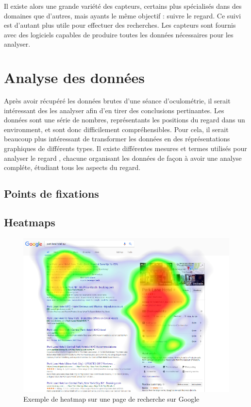 \documentclass[12pt]{article}
\begin{document}
\bigskip
Il existe alors une grande variété des capteurs, certains plus spécialisés dans
des domaines que d'autres, mais ayants le même objectif : suivre le regard. Ce
suivi est d'autant plus utile pour effectuer des recherches. Les capteurs sont
fournis avec des logiciels capables de produire toutes les données nécessaires
pour les analyser.


\section{Analyse des données}

Après avoir récupéré les données brutes d'une séance d'oculométrie, il serait
intéressant des les analyser afin d'en tirer des conclusions pertinantes. Les
données sont une série de nombres, représentants les positions du regard dans un
environment, et sont donc difficilement compréhensibles. Pour cela, il serait
beaucoup plus intéressant de transformer les données en des réprésentations
graphiques de différents types. Il existe différentes mesures et termes
utilisés pour analyser le regard \cite{imotions:metrics}, chacune organisant
les données de façon à avoir une analyse compléte, étudiant tous les aspects du
regard.

\subsection{Points de fixations}

\subsection{Heatmaps}

\begin{figure}[htpb]
  \includegraphics[width=\textwidth,keepaspectratio=true]{heatmap.png}
  \caption{Exemple de heatmap sur une page de recherche sur Google}
\end{figure}
\end{document}
